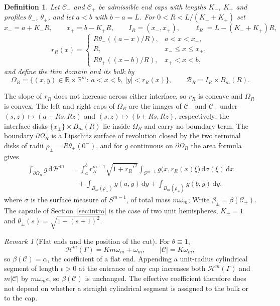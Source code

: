 \documentclass[11pt,a4paper]{article}
\numberwithin{equation}{section}
\theoremstyle{paperplain}
\newtheorem{definition}[theorem]{Definition}
\theoremstyle{remark}
\newtheorem{remark}[theorem]{Remark}
\newcommand{\R}{\mathbb{R}}
\newcommand{\C}{\mathcal{C}}
\newcommand{\B}{\mathcal{B}}
\newcommand{\HH}{\mathcal{H}}
\newcommand{\dd}{\,\mathrm d}
\begin{document}
\begin{definition}\label{def:domain}
Let $\C_-$ and $\C_+$ be admissible end caps with lengths $K_-$, $K_+$ and
profiles $\theta_-$, $\theta_+$, and let $a<b$ with $b-a=L$. For
$0<R<L/(K_-+K_+)$ set
\[
 x_-=a+K_-R,\qquad x_+=b-K_+R,\qquad I_R=(x_-,x_+),\qquad
 \ell_R=L-(K_-+K_+)R,
\]
\[
 r_R(x)=
 \begin{cases}
 R\theta_-((a-x)/R),&a<x<x_-,\\
 R,&x_-\le x\le x_+,\\
 R\theta_+((x-b)/R),&x_+<x<b,
 \end{cases}
\]
and define the \emph{thin domain} and its \emph{bulk} by
\begin{equation}\label{eq:domain}
 \Omega_R=\{(x,y)\in\R\times\R^m:\ a<x<b,\ |y|<r_R(x)\},\qquad
 \B_R=I_R\times B_m(R).
\end{equation}
\end{definition}

The slope of $r_R$ does not increase across either interface, so $r_R$ is
concave and $\Omega_R$ is convex. The left and right caps of $\Omega_R$ are the images of $\C_-$ and $\C_+$
under $(s,z)\mapsto(a-Rs,Rz)$ and $(s,z)\mapsto(b+Rs,Rz)$, respectively; the
interface disks $\{x_\pm\}\times B_m(R)$ lie inside $\Omega_R$ and carry no
boundary term. The boundary $\partial\Omega_R$ is a Lipschitz surface of
revolution closed by the two terminal disks of radii
$\rho_\pm=R\theta_\pm(0^-)$, and for $g$ continuous on $\partial\Omega_R$
the area formula gives
\begin{equation}\label{eq:boundary-integral}
\begin{aligned}
 \int_{\partial\Omega_R}g\dd\HH^m
 &=\int_a^b r_R^{m-1}\sqrt{1+r_R'^2}
   \int_{S^{m-1}}g\bigl(x,r_R(x)\xi\bigr)\dd\sigma(\xi)\dd x\\
 &\quad+\int_{B_m(\rho_-)}g(a,y)\dd y+\int_{B_m(\rho_+)}g(b,y)\dd y,
\end{aligned}
\end{equation}
where $\sigma$ is the surface measure of $S^{m-1}$, of total mass
$m\omega_m$; Write $\beta_\pm=\beta(\C_\pm)$. The capsule of
Section~\ref{sec:intro} is the case of two unit hemispheres,
$K_\pm=1$ and $\theta_\pm(s)=\sqrt{1-(s+1)^2}$.

\begin{remark}[Flat ends and the position of the cut]\label{rem:flat}
For $\theta\equiv1$,
\[
 \HH^m(\Gamma)=Km\omega_m+\omega_m,\qquad |\C|=K\omega_m,
\]
so $\beta(\C)=\alpha$, the coefficient of a flat end.
Appending a unit-radius cylindrical segment of length $\epsilon>0$ at the
entrance of any cap increases both $\HH^m(\Gamma)$ and $m|\C|$ by
$m\omega_m\epsilon$, so $\beta(\C)$ is unchanged. The effective coefficient therefore
does not depend on whether a straight cylindrical segment is assigned to
the bulk or to the cap.
\end{remark}
\end{document}
